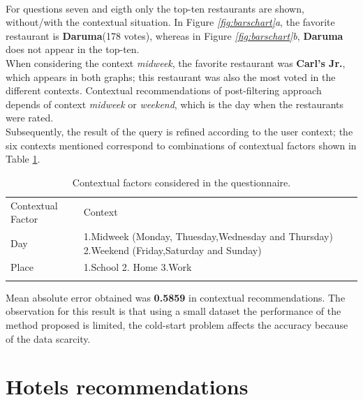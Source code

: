 \\For questions seven and eigth only the top-ten restaurants are shown,
without/with the contextual situation. In Figure  \textit{\ref{fig:barschart}a},
the favorite restaurant is \textbf{Daruma}(178 votes),  whereas in
Figure  \textit{\ref{fig:barschart}b}, \textbf{Daruma} does not appear in the
top-ten. \\When considering the context \textit{midweek}, the favorite
restaurant was \textbf{Carl's Jr.}, which appears in both graphs; this
restaurant was also the most voted in the different contexts.
Contextual recommendations of post-filtering approach depends of
context \textit{midweek} or \textit{weekend}, which is the day when
the restaurants were rated. \\Subsequently, the result of the query is
refined according to the user context; the six contexts mentioned
correspond to combinations of contextual factors shown in 
Table  \ref{tab:contextstijuana}.
\begin{table}
\small
\captionsetup{font=footnotesize}
\caption{Contextual factors considered in the questionnaire.}
\label{tab:contextstijuana} 
\centering
\begin{tabular}{p{2.0cm} p{10cm} }
\hline\noalign{\smallskip}
Contextual Factor & Context \\
\noalign{\smallskip}\hline\noalign{\smallskip}
\small{Day} & \small{1.Midweek (Monday, Thuesday,Wednesday and Thursday)
2.Weekend (Friday,Saturday and Sunday)}  \\ \hline 
\small{Place} & \small{1.School 2. Home 3.Work} \\ 
\noalign{\smallskip}\hline
\end{tabular}
\end{table}
Mean absolute error obtained was \textbf{0.5859}  in contextual
recommendations.  The observation for this result is that using a
small dataset the performance of the method proposed is limited, the
cold-start  problem affects the accuracy because of the data scarcity.

\section{Hotels recommendations} \label{hotels}

